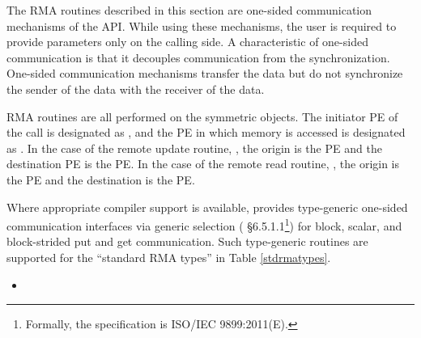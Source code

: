The \ac{RMA} routines described in this section are one-sided communication
mechanisms of the \openshmem{} \ac{API}. While using these mechanisms, the user
is required to provide parameters only on the calling side. A characteristic of
one-sided communication is that it decouples communication from the
synchronization. One-sided communication mechanisms transfer the data but do not
synchronize the sender of the data with the receiver of the data. 

\openshmem{} \ac{RMA} routines are all performed on the symmetric objects.  The
initiator \ac{PE} of the call is designated as \source{}, and the \ac{PE} in
which memory is accessed is designated as \dest{}. In the case of the remote
update routine, \PUT{}, the origin is the \source{} \ac{PE} and the destination
\ac{PE} is the \dest{} PE. In the case of the remote read routine, \GET{}, the
origin is the \dest{} \ac{PE} and the destination is the \source{} \ac{PE}.

Where appropriate compiler support is available, \openshmem{} provides type-generic 
one-sided communication interfaces via \Celev{} generic selection 
(\Celev{} \S6.5.1.1\footnote{Formally, the \Celev{} specification is ISO/IEC 9899:2011(E).})
for block, scalar, and block-strided put and get communication. 
Such type-generic routines are supported for the
``standard \ac{RMA} types''
  in Table \ref{stdrmatypes}.

\textbf{}
\begin{itemize}
\item {}
\end{itemize}

